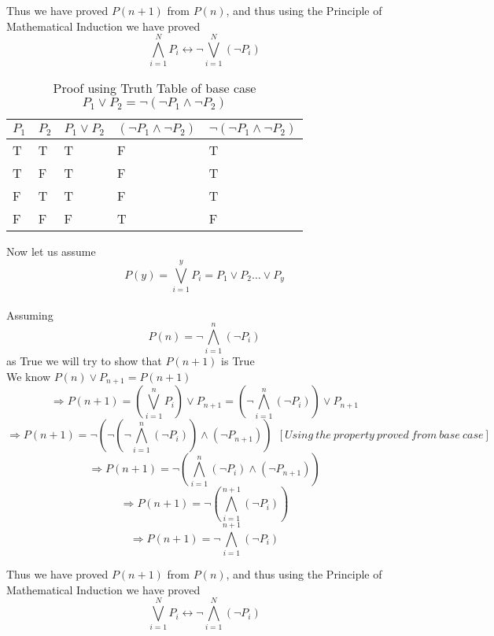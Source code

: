 \documentclass[10.5pt]{article}
\newenvironment{solution}[2][Solution]{ \begin{trivlist}
\item[\hskip \labelsep {\bfseries #1}]}{\end{trivlist}}
\newenvironment{problem}[2][Problem]{\begin{trivlist}
\item[\hskip \labelsep {\bfseries #1}\hskip \labelsep {\bfseries #2.}]}{\end{trivlist}}
\begin{document}
\begin{solution}{7}
Thus we have proved $P(n+1)$ from $P(n)$, and thus using the Principle of Mathematical Induction we have proved \[
\bigwedge_{i = 1}^N P_i \leftrightarrow \lnot \bigvee_{i = 1}^N (\lnot P_i)
\]

\pagebreak

\begin{table}[!h]
\centering
\caption{Proof using Truth Table of base case $P_{1} \vee P_{2} = \lnot(\lnot P_{1} \wedge \lnot P_{2})$ }
\label{my-label}
\begin{tabular}{|l|l|l|l|l|}
\hline
$P_{1}$ & $P_{2}$ & $P_{1} \vee P_{2}$ & $(\lnot P_{1} \wedge \lnot P_{2})$ & $\lnot(\lnot P_{1} \wedge \lnot P_{2})$ \\ \hline
T & T & T     & F                 & T                    \\ \hline
T & F & T     & F                 & T                   \\ \hline
F & T & T     & F                 & T                    \\ \hline
F & F & F     & T                 & F                    \\ \hline
\end{tabular}
\end{table}

Now let us assume $$P(y) =
\bigvee_{i = 1}^y P_i = P_1 \vee P_2 \ldots \vee P_y$$\\
Assuming $$P(n) = \lnot \bigwedge_{i = 1}^n (\lnot P_i)$$ as True we will try to show that $P(n+1)$ is True\\
We know $P(n) \vee P_{n+1} = P(n+1)$
$$\Rightarrow P(n+1) = (\bigvee_{i = 1}^n P_i) \vee P_{n+1}  = (\lnot \bigwedge_{i = 1}^n (\lnot P_i)) \vee P_{n+1}$$
$$\Rightarrow P(n+1) = \lnot (\lnot (\lnot \bigwedge_{i = 1}^n (\lnot P_i)) \wedge (\lnot P_{n+1}))\ \  [Using\ the\ property\ proved\ from\ base\ case]$$
$$\Rightarrow P(n+1) = \lnot (\bigwedge_{i = 1}^n (\lnot P_i) \wedge (\lnot P_{n+1}))$$
$$\Rightarrow P(n+1) = \lnot (\bigwedge_{i = 1}^{n+1} (\lnot P_i))$$
$$\Rightarrow P(n+1) = \lnot \bigwedge_{i = 1}^{n+1} (\lnot P_i)$$

Thus we have proved $P(n+1)$ from $P(n)$, and thus using the Principle of Mathematical Induction we have proved \[
\bigvee_{i = 1}^N P_i \leftrightarrow \lnot \bigwedge_{i = 1}^N (\lnot P_i)
\]


\end{solution}
\vskip 0.5in


\end{document}
